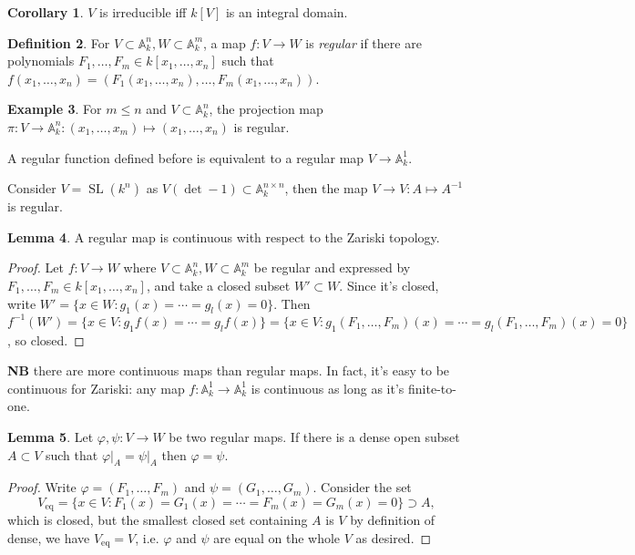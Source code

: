 \documentclass{article}
\newcommand{\A}{\mathbb{A}}
\newcommand{\SL}{\operatorname{SL}}
\theoremstyle{definition}
\newtheorem{defn}{Definition}[subsection]
\newtheorem{lemma}[defn]{Lemma}
\newtheorem{coro}[defn]{Corollary}
\newtheorem{example}[defn]{Example}
\begin{document}
\begin{coro}
$V$ is irreducible iff $k[V]$ is an integral domain.
\end{coro}

\begin{defn}
For $V\subset\A_k^n,W\subset\A_k^m$, a map $f:V\rightarrow W$ is \textit{regular} if there are polynomials $F_1,\ldots,F_m\in k[x_1,\ldots,x_n]$ such that $f(x_1,\ldots,x_n)=(F_1(x_1,\ldots,x_n),\ldots,F_m(x_1,\ldots,x_n))$.
\end{defn}

\begin{example}
For $m\leq n$ and $V\subset\A_k^n$, the projection map $\pi:V\rightarrow\A_k^n:(x_1,\ldots,x_m)\mapsto (x_1,\ldots,x_n)$ is regular.

A regular function defined before is equivalent to a regular map $V\rightarrow\A_k^1$.

Consider $V=\SL(k^n)$ as $V(\det-1)\subset\A_k^{n\times n}$, then the map $V\rightarrow V:A\mapsto A^{-1}$ is regular.
\end{example}

\begin{lemma}
\label{lemma:regcontaff}
A regular map is continuous with respect to the Zariski topology.
\end{lemma}
\begin{proof}
Let $f:V\rightarrow W$ where $V\subset\A_k^n,W\subset\A_k^m$ be regular and expressed by $F_1,\ldots,F_m\in k[x_1,\ldots,x_n]$, and take a closed subset $W'\subset W$. Since it's closed, write $W'=\{x\in W:g_1(x)=\cdots=g_l(x)=0\}$. Then $f^{-1}(W')=\{x\in V:g_1f(x)=\cdots=g_lf(x)\}=\{x\in V:g_1(F_1,\ldots,F_m)(x)=\cdots=g_l(F_1,\ldots,F_m)(x)=0\}$, so closed.
\end{proof}

\textbf{NB} there are more continuous maps than regular maps. In fact, it's easy to be continuous for Zariski: any map $f:\A_k^1\rightarrow\A_k^1$ is continuous as long as it's finite-to-one.

\begin{lemma}
\label{lemma:denseequalaffine}
Let $\varphi,\psi:V\rightarrow W$ be two regular maps. If there is a dense open subset $A\subset V$ such that $\left.\varphi\right|_A=\left.\psi\right|_A$ then $\varphi=\psi$.
\end{lemma}
\begin{proof}
Write $\varphi=(F_1,\ldots,F_m)$ and $\psi=(G_1,\ldots,G_m)$. Consider the set
\[
V_{\operatorname{eq}}=\{x\in V:F_1(x)=G_1(x)=\cdots=F_m(x)=G_m(x)=0\}\supset A,
\]
which is closed, but the smallest closed set containing $A$ is $V$ by definition of dense, we have $V_{\operatorname{eq}}=V$, i.e. $\varphi$ and $\psi$ are equal on the whole $V$ as desired.
\end{proof}
\end{document}
